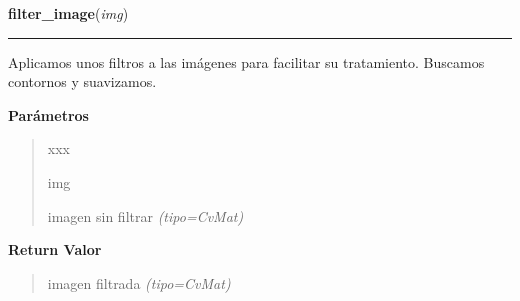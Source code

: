 \hspace{.8\funcindent}\begin{boxedminipage}{\funcwidth}

    \raggedright \textbf{filter\_image}(\textit{img})

    \vspace{-1.5ex}

    \rule{\textwidth}{0.5\fboxrule}
\setlength{\parskip}{2ex}
Aplicamos unos filtros a las imágenes para facilitar su tratamiento. Buscamos contornos y suavizamos.

\setlength{\parskip}{1ex}
      \textbf{Parámetros}
      \vspace{-1ex}

      \begin{quote}
        \begin{Ventry}{xxx}

          \item[img]


imagen sin filtrar
            {\it (tipo=CvMat)}

        \end{Ventry}

      \end{quote}

      \textbf{Return Valor}
    \vspace{-1ex}

      \begin{quote}

imagen filtrada
      {\it (tipo=CvMat)}

      \end{quote}

    \end{boxedminipage}

    \label{src:search_goban:detect_contour}

    \vspace{0.5ex}


